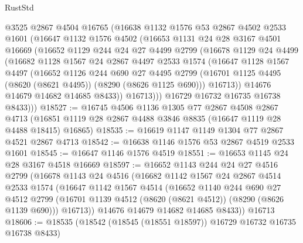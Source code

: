 \begin{lexlean}{RustStd}
\begin{coremodule}
        @3525
        @2867
        @4504
        @16765
        (@16638
          @1132
          @1576
          @53
          @2867
          @4502
          @2533
          @1601
          (@16647
            @1132
            @1576
            @4502
            (@16653
              @1131
              @24
              @28
              @3167
              @4501
              @16669
              (@16652
                @1129
                @244
                @24
                @27
                @4499
                @2799
                (@16678
                  @1129
                  @24
                  @4499
                  (@16682
                    @1128
                    @1567
                    @24
                    @2867
                    @4497
                    @2533
                    @1574
                    (@16647
                      @1128
                      @1567
                      @4497
                      (@16652
                        @1126
                        @244
                        @690
                        @27
                        @4495
                        @2799
                        (@16701 @1125 @4495 (@8620 (@8621 @4495)) (@8290 (@8626 @1125 @690)))
                        @16713))
                    @14676
                    @14679
                    @14682
                    @14685
                    @8433))
                @16713)))
          @16729
          @16732
          @16735
          @16738
          @8433)))
@18527 := @16745
    @4506
    @1136
    @1305
    @77
    @2867
    @4508
    @2867
    @4713
    (@16851 @1119 @28 @2867 @4488 @3846 @8835 (@16647 @1119 @28 @4488 @18415) @16865)
@18535 := @16619 @1147 @1149 @1304 @77 @2867 @4521 @2867 @4713
@18542 := @16638 @1146 @1576 @53 @2867 @4519 @2533 @1601
@18545 := @16647 @1146 @1576 @4519
@18551 := @16653 @1145 @24 @28 @3167 @4518 @16669
@18597 := @16652
    @1143
    @244
    @24
    @27
    @4516
    @2799
    (@16678
      @1143
      @24
      @4516
      (@16682
        @1142
        @1567
        @24
        @2867
        @4514
        @2533
        @1574
        (@16647
          @1142
          @1567
          @4514
          (@16652
            @1140
            @244
            @690
            @27
            @4512
            @2799
            (@16701 @1139 @4512 (@8620 (@8621 @4512)) (@8290 (@8626 @1139 @690)))
            @16713))
        @14676
        @14679
        @14682
        @14685
        @8433))
    @16713
@18606 := @18535 (@18542 (@18545 (@18551 @18597)) @16729 @16732 @16735 @16738 @8433)

\end{coremodule}
\end{lexlean}
